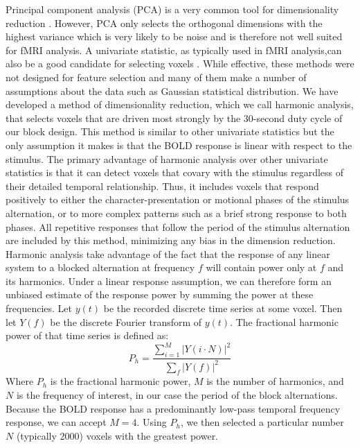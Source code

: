 \documentclass[preprint,5p,authoryear]{elsarticle}
\begin{document}
Principal component analysis (PCA) is a very common tool for dimensionality reduction \citep{Hotelling1933}.
However, PCA only selects the orthogonal dimensions with the highest variance which is very likely to be noise and is therefore not well suited for fMRI analysis.
A univariate statistic, as typically used in  fMRI analysis,can also be a good candidate for selecting voxels \citep{Norman2006,Pereira2009}.
While effective, these methods were not designed for feature selection and many of them make a number of assumptions about the data such as Gaussian statistical distribution.
We have developed a method of dimensionality reduction, which we call harmonic analysis, that selects voxels that are driven most strongly by the 30-second duty cycle of our block design.
This method is similar to other univariate statistics but the only assumption it makes is that the BOLD response is linear with respect to the stimulus.
The primary advantage  of harmonic analysis over other univariate statistics is that it can detect voxels that covary with the stimulus regardless of their detailed temporal relationship. Thus, it includes voxels that respond positively to either the character-presentation or motional phases of the stimulus alternation, or to more complex patterns such as a brief strong response to both phases. All repetitive responses that follow the period of the stimulus alternation are included by this method, minimizing any bias in the dimension reduction.
Harmonic analysis take advantage of the fact that the response of any linear system to a blocked alternation at frequency $f$ will contain power only at $f$ and its harmonics. 
Under a linear response assumption, we can therefore form an unbiased estimate of the response power by summing the power at these frequencies. 
Let $y(t)$ be the recorded discrete time series at some voxel.
Then let $Y(f)$ be the discrete Fourier transform of $y(t)$.
The fractional harmonic power of that time series is defined as:
\begin{equation}
P_h = \frac{\sum_{i = 1}^{M}{\left|Y(i \cdot N)\right|^{2}}}{\sum_{f}{\left|Y(f)\right|^{2}}}
\end{equation}
Where $P_h$ is the fractional harmonic power, $M$ is the number of harmonics, and $N$ is the frequency of interest, in our case the period of the block alternations. 
Because the BOLD response has a predominantly low-pass temporal frequency response, we can accept $M = 4$. 
Using $P_h$, we then selected a particular number $N$ (typically 2000) voxels with the greatest power. 
\end{document}
